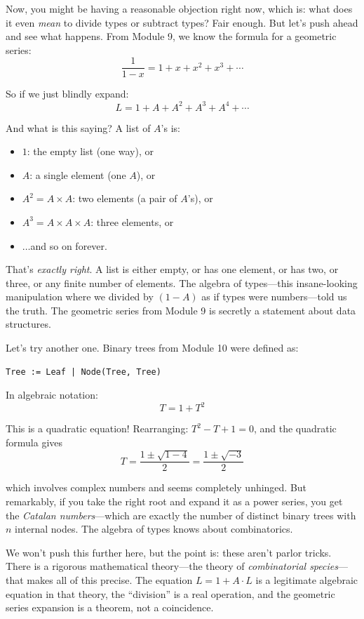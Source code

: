 \documentclass[11pt]{article}
\begin{document}
Now, you might be having a reasonable objection right now, which is: what does it even \emph{mean} to divide types or subtract types? Fair enough. But let's push ahead and see what happens. From Module 9, we know the formula for a geometric series:
\[
\frac{1}{1 - x} = 1 + x + x^2 + x^3 + \cdots
\]

So if we just blindly expand:
\[
L = 1 + A + A^2 + A^3 + A^4 + \cdots
\]

And what is this saying? A list of $A$'s is:
\begin{itemize}
  \item $1$: the empty list (one way), or
  \item $A$: a single element (one $A$), or
  \item $A^2 = A \times A$: two elements (a pair of $A$'s), or
  \item $A^3 = A \times A \times A$: three elements, or
  \item $\ldots$and so on forever.
\end{itemize}

That's \emph{exactly right}. A list is either empty, or has one element, or has two, or three, or any finite number of elements. The algebra of types---this insane-looking manipulation where we divided by $(1 - A)$ as if types were numbers---told us the truth. The geometric series from Module 9 is secretly a statement about data structures.

\medskip
Let's try another one. Binary trees from Module 10 were defined as:

\begin{lstlisting}
Tree := Leaf | Node(Tree, Tree)
\end{lstlisting}

In algebraic notation:
\[
T = 1 + T^2
\]

This is a quadratic equation! Rearranging: $T^2 - T + 1 = 0$, and the quadratic formula gives
\[
T = \frac{1 \pm \sqrt{1 - 4}}{2} = \frac{1 \pm \sqrt{-3}}{2}
\]

which involves complex numbers and seems completely unhinged. But remarkably, if you take the right root and expand it as a power series, you get the \emph{Catalan numbers}---which are exactly the number of distinct binary trees with $n$ internal nodes. The algebra of types knows about combinatorics.

We won't push this further here, but the point is: these aren't parlor tricks. There is a rigorous mathematical theory---the theory of \emph{combinatorial species}---that makes all of this precise. The equation $L = 1 + A \cdot L$ is a legitimate algebraic equation in that theory, the ``division'' is a real operation, and the geometric series expansion is a theorem, not a coincidence.
\end{document}
